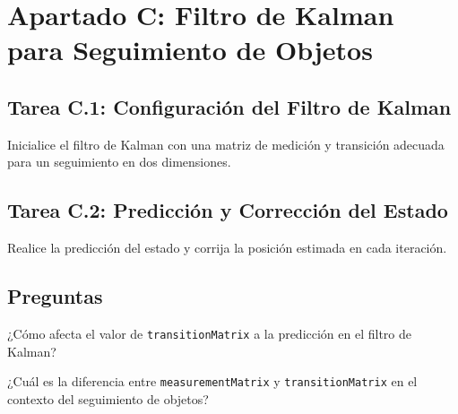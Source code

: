 \chapter{Apartado C: \textbf{Filtro de Kalman para Seguimiento de Objetos}}
\label{chapter:tarea_c}

\section*{Tarea C.1: Configuración del Filtro de Kalman}
{}
Inicialice el filtro de Kalman con una matriz de medición y transición adecuada para un seguimiento en dos dimensiones.

\section*{Tarea C.2: Predicción y Corrección del Estado}
{}
Realice la predicción del estado y corrija la posición estimada en cada iteración.

\section*{Preguntas}

\vspace{5mm}
\begin{tcolorbox}[colback=gray!10, colframe=gray!30, coltitle=black, title=Pregunta C.1, halign=left]
¿Cómo afecta el valor de \texttt{transitionMatrix} a la predicción en el filtro de Kalman?
\end{tcolorbox}

\vspace{5mm}
\begin{tcolorbox}[colback=gray!10, colframe=gray!30, coltitle=black, title=Pregunta C.2, halign=left]
¿Cuál es la diferencia entre \texttt{measurementMatrix} y \texttt{transitionMatrix} en el contexto del seguimiento de objetos?
\end{tcolorbox}